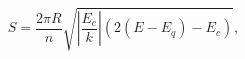 \begin{equation}
 S=\frac{2\pi R}{n}\sqrt{|\frac{E_{c}}{k}|(2(E-E_q)-E_c)},\label{careq}
\end{equation}

